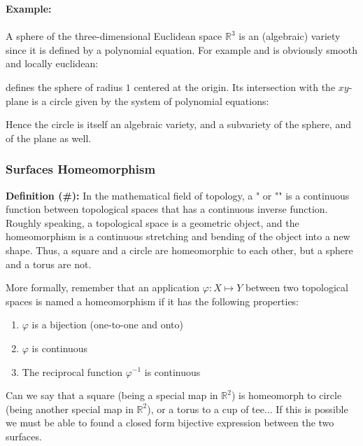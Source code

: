 	\begin{tcolorbox}[colframe=black,colback=white,sharp corners]
	\textbf{{\Large {}}Example:}\\\\
	A sphere of the three-dimensional Euclidean space $\mathbb{R}^3$ is an (algebraic) variety since it is defined by a polynomial equation. For example and is obviously smooth and locally euclidean:
	
	defines the sphere of radius $1$ centered at the origin. Its intersection with the $xy$-plane is a circle given by the system of polynomial equations:
	
	Hence the circle is itself an algebraic variety, and a subvariety of the sphere, and of the plane as well.
	\end{tcolorbox}
	

	\pagebreak
	\subsubsection{Surfaces Homeomorphism}
	\textbf{Definition (\#\mydef):} In the mathematical field of topology, a " or "" is a continuous function between topological spaces that has a continuous inverse function. Roughly speaking, a topological space is a geometric object, and the homeomorphism is a continuous stretching and bending of the object into a new shape. Thus, a square and a circle are homeomorphic to each other, but a sphere and a torus are not. 
	
	More formally, remember that an application $\varphi: X \mapsto Y$ between two topological spaces is named a homeomorphism if it has the following properties:
	\begin{enumerate}
		\item $\varphi$ is a bijection (one-to-one and onto)
		
		\item $\varphi$ is continuous
		
		\item The reciprocal function $\varphi^{-1}$ is continuous 
	\end{enumerate}
	
	Can we say that a square (being a special map in $\mathbb{R}^2$) is homeomorph to circle (being another special map in $\mathbb{R}^2$), or a torus to a cup of tee... If this is possible we must be able to found a closed form bijective expression between the two surfaces.
	
